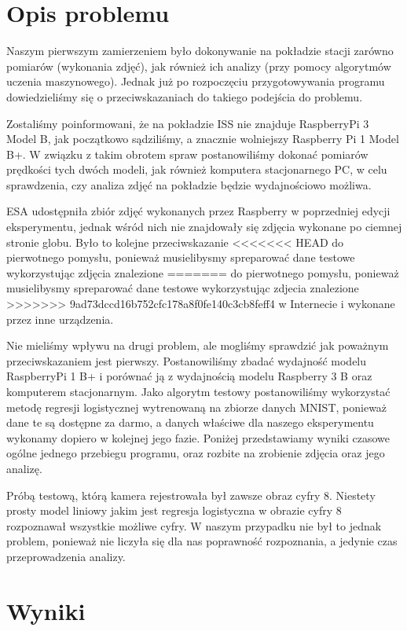 \section{Opis problemu}\label{sec:performance_introduction}

Naszym pierwszym zamierzeniem było dokonywanie na pokładzie stacji zarówno pomiarów
(wykonania zdjęć), jak również ich analizy (przy pomocy algorytmów uczenia maszynowego). Jednak już po
rozpoczęciu przygotowywania programu dowiedzieliśmy się o przeciwskazaniach do takiego
podejścia do problemu.

Zostaliśmy poinformowani, że na pokładzie ISS nie znajduje RaspberryPi 3
Model B, jak początkowo sądziliśmy, a znacznie wolniejszy Raspberry Pi 1 Model B+. W związku
z takim obrotem spraw postanowiliśmy dokonać pomiarów prędkości tych dwóch modeli, jak
również komputera stacjonarnego PC, w celu sprawdzenia, czy analiza zdjęć na pokładzie będzie
wydajnościowo możliwa.

ESA udostępniła zbiór zdjęć wykonanych przez Raspberry w poprzedniej edycji eksperymentu, jednak
wśród nich nie znajdowały się zdjęcia wykonane po ciemnej stronie globu. Było to kolejne przeciwskazanie
<<<<<<< HEAD
do pierwotnego pomysłu, ponieważ musielibysmy spreparować dane testowe wykorzystując zdjęcia znalezione
=======
do pierwotnego pomysłu, ponieważ musielibysmy spreparować dane testowe wykorzystując zdjecia znalezione
>>>>>>> 9ad73dccd16b752cfc178a8f0fe140c3cb8feff4
w Internecie i wykonane przez inne urządzenia.

Nie mieliśmy wpływu na drugi problem, ale mogliśmy sprawdzić jak poważnym przeciwskazaniem jest pierwszy.
Postanowiliśmy zbadać wydajność modelu RaspberryPi 1 B+ i porównać ją z wydajnością modelu Raspberry 3 B oraz
komputerem stacjonarnym. Jako algorytm testowy postanowiliśmy wykorzystać metodę regresji logistycznej
wytrenowaną na zbiorze danych MNIST, ponieważ dane te są dostępne za darmo, a danych właściwe dla naszego
eksperymentu wykonamy dopiero w kolejnej jego fazie. Poniżej przedstawiamy wyniki czasowe ogólne jednego
przebiegu programu, oraz rozbite na zrobienie zdjęcia oraz jego analizę.

Próbą testową, którą kamera rejestrowała był zawsze obraz cyfry 8. Niestety prosty model liniowy jakim jest
regresja logistyczna w obrazie cyfry 8 rozpoznawał wszystkie możliwe cyfry. W naszym przypadku nie był to
jednak problem, ponieważ nie liczyła się dla nas poprawność rozpoznania, a jedynie czas przeprowadzenia analizy.

\section{Wyniki}\label{sec:performance_results}


